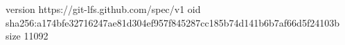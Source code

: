 version https://git-lfs.github.com/spec/v1
oid sha256:a174bfe32716247ae81d304ef957f845287cc185b74d141b6b7af66d5f24103b
size 11092
